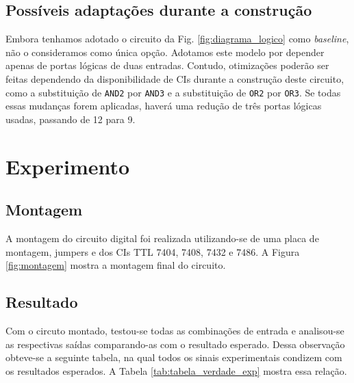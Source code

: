 \documentclass[a4,12pt]{horizon-theme}
\begin{document}
\subsection{Possíveis adaptações durante a construção}
\label{sec:adaptacoes}
Embora tenhamos adotado o circuito da Fig. \ref{fig:diagrama_logico} como \emph{baseline}, não o consideramos como única opção. Adotamos este modelo por depender apenas de portas lógicas de duas entradas. Contudo, otimizações poderão ser feitas dependendo da disponibilidade de CIs durante a construção deste circuito, como a substituição de \texttt{AND2} por \texttt{AND3} e a substituição de \texttt{OR2} por \texttt{OR3}. Se todas essas mudanças forem aplicadas, haverá uma redução de três portas lógicas usadas, passando de 12 para 9.



\section{Experimento}
\label{sec:experimento}

\subsection{Montagem}


A montagem do circuito digital foi realizada utilizando-se de uma placa de montagem, jumpers e dos CIs TTL 7404, 7408, 7432 e 7486. A Figura \ref{fig:montagem} mostra a montagem final do circuito.

\subsection{Resultado}

Com o circuto montado, testou-se todas as combinações de entrada e analisou-se as respectivas saídas comparando-as com o resultado esperado. Dessa observação obteve-se a seguinte tabela, na qual todos os sinais experimentais condizem com os resultados esperados. A Tabela \ref{tab:tabela_verdade_exp} mostra essa relação.
\end{document}
